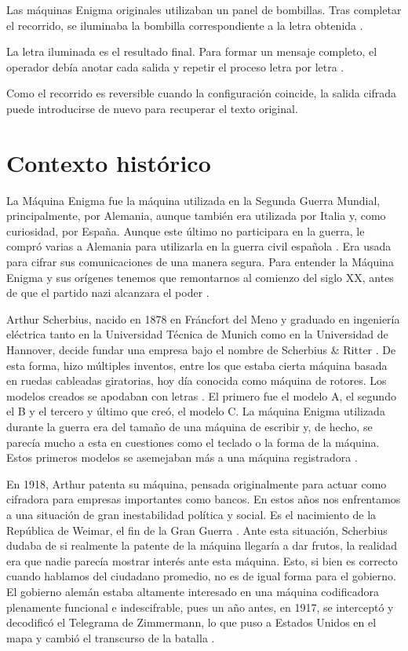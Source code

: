 Las máquinas Enigma originales utilizaban un panel de bombillas. Tras completar el recorrido, se iluminaba la bombilla correspondiente a la letra obtenida \cite{cripta_hacker_enigma}.


La letra iluminada es el resultado final. Para formar un mensaje completo, el operador debía anotar cada salida y repetir el proceso letra por letra \cite{cryptomuseum_enigma}.


Como el recorrido es reversible cuando la configuración coincide, la salida cifrada puede introducirse de nuevo para recuperar el texto original.


\section {Contexto histórico}

La Máquina Enigma fue la máquina utilizada en la Segunda Guerra Mundial, principalmente, por Alemania, aunque también era utilizada por Italia y, como curiosidad, por España. Aunque este último no participara en la guerra, le compró varias a Alemania para utilizarla en la guerra civil española \cite{taylor_enigma}. Era usada para cifrar sus comunicaciones de una manera segura. Para entender la Máquina Enigma y sus orígenes tenemos que remontarnos al comienzo del siglo XX, antes de que el partido nazi alcanzara el poder \cite{ierardo_enigma}.


Arthur Scherbius, nacido en 1878 en Fráncfort del Meno y graduado en ingeniería eléctrica tanto en la Universidad Técnica de Munich como en la Universidad de Hannover, decide fundar una empresa bajo el nombre de Scherbius \& Ritter \cite{wiki_scherbius}. De esta forma, hizo múltiples inventos, entre los que estaba cierta máquina basada en ruedas cableadas giratorias, hoy día conocida como máquina de rotores. Los modelos creados se apodaban con letras \cite{abc_scherbius}. El primero fue el modelo A, el segundo el B y el tercero y último que creó, el modelo C. La máquina Enigma utilizada durante la guerra era del tamaño de una máquina de escribir y, de hecho, se parecía mucho a esta en cuestiones como el teclado o la forma de la máquina. Estos primeros modelos se asemejaban más a una máquina registradora \cite{abc_scherbius}.


En 1918, Arthur patenta su máquina, pensada originalmente para actuar como cifradora para empresas importantes como bancos. En estos años nos enfrentamos a una situación de gran inestabilidad política y social. Es el nacimiento de la República de Weimar, el fin de la Gran Guerra \cite{weimar_junta}. Ante esta situación, Scherbius dudaba de si realmente la patente de la máquina llegaría a dar frutos, la realidad era que nadie parecía mostrar interés ante esta máquina. Esto, si bien es correcto cuando hablamos del ciudadano promedio, no es de igual forma para el gobierno. El gobierno alemán estaba altamente interesado en una máquina codificadora plenamente funcional e indescifrable, pues un año antes, en 1917, se interceptó y decodificó el Telegrama de Zimmermann, lo que puso a Estados Unidos en el mapa y cambió el transcurso de la batalla \cite{telegrama_zimmermann}.


